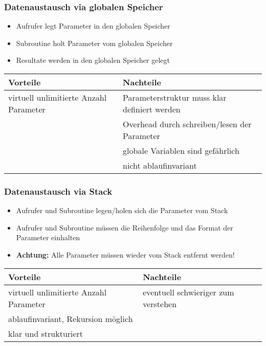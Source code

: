 \subsubsection{Datenaustausch via globalen Speicher}
\begin{itemize}
  \item Aufrufer legt Parameter in den globalen Speicher
  \item Subroutine holt Parameter vom globalen Speicher
  \item Resultate werden in den globalen Speicher gelegt
\end{itemize}
\begin{tabular}{p{}|l}
	\textbf{Vorteile} 	& \textbf{Nachteile} \\
	\hline
	virtuell unlimitierte Anzahl Parameter	& Parameterstruktur muss klar definiert werden \\
											& Overhead durch schreiben/lesen der Parameter \\
											& globale Variablen sind gefährlich \\
											& nicht ablaufinvariant
\end{tabular}


\subsubsection{Datenaustausch via Stack}
\begin{itemize}
  \item Aufrufer und Subroutine legen/holen sich die Parameter vom Stack
  \item Aufrufer und Subroutine müssen die Reihenfolge und das Format der Parameter einhalten
  \item \textbf{Achtung:} Alle Parameter müssen wieder vom Stack entfernt werden!
\end{itemize}
\begin{tabular}{p{}|l}
	\textbf{Vorteile} 	& \textbf{Nachteile} \\
	\hline
	virtuell unlimitierte Anzahl Parameter	& eventuell schwieriger zum verstehen \\
	ablaufinvariant, Rekursion möglich 		& \\
	klar und strukturiert					&
\end{tabular}

